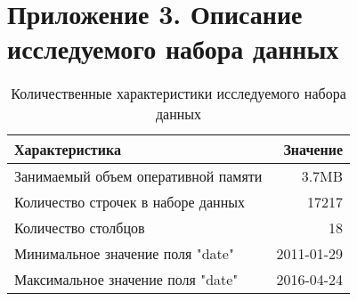 ﻿
\chapter{Приложение 3. Описание исследуемого набора данных}


\begin{table}
    \centering
    \begin{tabular}{|l|r|}
		\hline
			Характеристика	& Значение \\
		\hline
			Занимаемый объем оперативной памяти & 3.7MB      \\
			Количество строчек в наборе данных  & 17217      \\
            Количество столбцов                 & 18         \\
			Минимальное значение поля "date"    & 2011-01-29 \\
            Максимальное значение поля "date"   & 2016-04-24 \\
		\hline
	\end{tabular}
	\caption{ Количественные характеристики исследуемого набора данных }
	\label{tbl:sales_dataset_description_quantitive}
\end{table}


